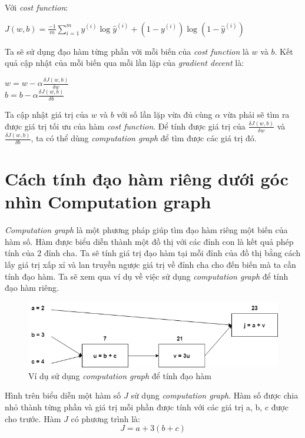 Với \textit{cost function}:
\begin{center}
$J(w, b) = \frac{-1}{m}\sum_{i=1}^{m}y^{(i)}\log \hat{y}^{(i)}+(1-y^{(i)})\log (1-\hat{y}^{(i)})$
\end{center}

Ta sẽ sử dụng đạo hàm từng phần với mỗi biến của \textit{cost function} là $w$ và $b$. Kết quả cập nhật của mỗi biến qua mỗi lần lặp của \textit{gradient decent} là:
\begin{center}
$w = w - \alpha\frac{\delta J(w, b)}{\delta w}$\\
$b = b - \alpha\frac{\delta J(w, b)}{\delta b}$
\end{center}

Ta cập nhật giá trị của $w$ và $b$ với số lần lặp vừa đủ cùng $\alpha$ vừa phải sẽ tìm ra được giá trị tối ưu của hàm \textit{cost function}. Để tính được giá trị của $\frac{\delta J(w, b)}{\delta w}$ và $\frac{\delta J(w, b)}{\delta b}$, ta có thể dùng \textit{computation graph} để tìm được các giá trị đó.

\section{Cách tính đạo hàm riêng dưới góc nhìn Computation graph}
\textit{Computation graph} là một phương pháp giúp tìm đạo hàm riêng một biến của hàm số. Hàm được biểu diễn thành một đồ thị với các đỉnh con là kết quả phép tính của 2 đỉnh cha. Ta sẽ tính giá trị đạo hàm tại mỗi đỉnh của đồ thị bằng cách lấy giá trị xấp xỉ và lan truyền ngược giá trị về đỉnh cha cho đến biến mà ta cần tính đạo hàm. Ta sẽ xem qua ví dụ về việc sử dụng \textit{computation graph} để tính đạo hàm riêng.
\begin{figure}[!h]
\centerline{\includegraphics[scale=0.5]{chapter02/figure/com_1.png}}
\caption{Ví dụ sử dụng \textit{computation graph} để tính đạo hàm}
\label{fig:com_1}
\end{figure}

Hình trên biểu diễn một hàm số $J$ sử dụng \textit{computation graph}. Hàm số được chia nhỏ thành từng phần và giá trị mỗi phần được tính với các giá trị a, b, c được cho trước. Hàm $J$ có phương trình là:
\begin{equation}
\label{sec2:eqn6}
J = a + 3(b + c) 
\end{equation}

